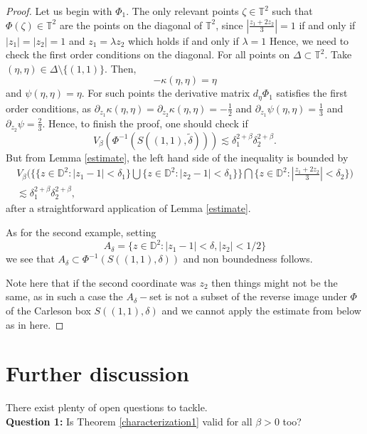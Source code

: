 \documentclass[12pt]{amsart}
\numberwithin{equation}{section}
\begin{document}
\begin{proof} Let us begin with $\Phi_1.$ The only relevant points $\zeta\in\mathbb{T}^2$ such that $\Phi(\zeta)\in\mathbb{T}^2$ are the points on the diagonal of $\mathbb{T}^2$, since $\left|\frac{z_1+2z_2}{3}\right|=1$ if and only if $|z_1|=|z_2|=1 $ and $z_1=\lambda z_2$ which holds if and only if $\lambda=1$ Hence, we need to check the first order conditions on the diagonal. For all points on $\Delta\subset\mathbb{T}^2.$ Take $(\eta,\eta)\in\Delta\setminus\{(1,1)\}.$ Then, $$-\kappa(\eta,\eta)=\eta$$ and $\psi(\eta,\eta)=\eta.$ For such points the derivative matrix $d_{\eta}\Phi_1$ satisfies the first order conditions, as $\partial_{z_1}\kappa(\eta,\eta)=\partial_{z_2}\kappa(\eta,\eta)=-\frac{1}{2}$ and $\partial_{z_1}\psi(\eta,\eta)=\frac{1}{3}$ and $\partial_{z_2}\psi=\frac{2}{3}.$
Hence, to finish the proof, one should check if
$$V_{\beta}(\Phi^{-1}(S((1,1),\tilde{\delta})))\lesssim \delta_1^{2+\beta}\delta_2^{2+\beta}.$$
But from Lemma \ref{estimate}, the left hand side of the inequality is bounded by
\begin{multline}
V_{\beta}\Biggl(\Bigg\{\{z\in\mathbb{D}^2:|z_1-1|<\delta_1\}\bigcup\{z\in\mathbb{D}^2:|z_2-1|<\delta_1\}\Bigg\}\bigcap\Bigg\{z\in\mathbb{D}^2:\left|\frac{z_1+2z_2}{3}\right|<\delta_2\Bigg\} \Biggr)\\\lesssim \delta_1^{2+\beta}\delta_2^{2+\beta},
\end{multline}
after a straightforward application of Lemma \ref{estimate}. 

As for the second example, setting $$A_{\delta}=\bigg\{z\in\mathbb{D}^2:|z_1-1|<\delta,|z_2|<1/2\bigg\}$$ we see that $A_{\delta}\subset \Phi^{-1}(S((1,1),\delta))$ and non boundedness follows.

Note here that if the second coordinate was $z_2$ then things might not be the same, as in such a case the $A_{\delta}-$set is not a subset of the reverse image under $\Phi$ of the Carleson box $S((1,1),\delta)$ and we cannot apply the estimate from below as in here.
\end{proof}

\section{Further discussion} There exist plenty of open questions to tackle.\\ 

\textbf{Question 1:} Is Theorem \ref{characterization1} valid for all $\beta>0$ too? \\
\end{document}
